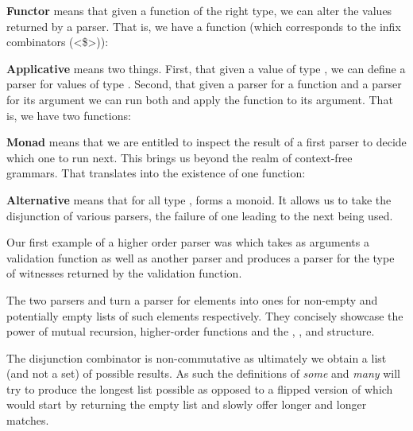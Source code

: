 \textbf{Functor} means that given a function of the right type, we
can alter the values returned by a parser. That is, we have a function
(which corresponds to the infix combinators (<\$>)):


\textbf{Applicative} means two things. First, that given a value of type
, we can define a parser for values of type . Second, that
given a parser for a function and a parser for its argument we can run both
and apply the function to its argument. That is, we have two functions:


\textbf{Monad} means that we are entitled to inspect the result of a
first parser to decide which one to run next. This brings us beyond the
realm of context-free grammars. That translates into the existence of
one function:


\textbf{Alternative} means that for all type , 
forms a monoid. It allows us to take the disjunction of various parsers,
the failure of one leading to the next being used.





Our first example of a higher order parser was 
which takes as arguments a validation function as well as another
parser and produces a parser for the type of witnesses returned
by the validation function.

The two parsers  and  turn a parser for elements
into ones for non-empty and potentially empty lists of such elements
respectively. They concisely showcase the power of mutual recursion,
higher-order functions and the , ,
and  structure.
\medskip{}

\begin{minipage}{0.45\textwidth}
\end{minipage}
\begin{minipage}{0.45\textwidth}
\end{minipage}

 The disjunction combinator is non-commutative
as ultimately we obtain a list (and not a set) of possible results. As
such the definitions of \textit{some} and \textit{many} will try to
produce the longest list possible as opposed to a flipped version of
 which would start by returning the empty list and slowly
offer longer and longer matches.


